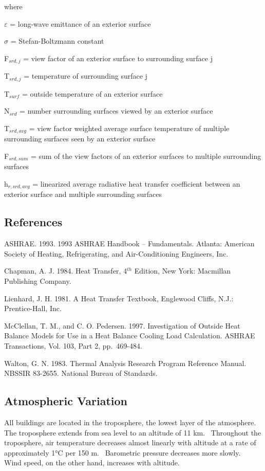 where

$\varepsilon$ = long-wave emittance of an exterior surface

$\sigma$ = Stefan-Boltzmann constant

F\(_{srd,j}\) = view factor of an exterior surface to surrounding surface j

T\(_{srd,j}\) = temperature of surrounding surface j

T\(_{surf}\) = outside temperature of an exterior surface

N\(_{srd}\) = number surrounding surfaces viewed by an exterior surface

T\(_{srd,avg}\) = view factor weighted average surface temperature of multiple surrounding surfaces seen by an exterior surface

F\(_{srd,sum}\) = sum of the view factors of an exterior surfaces to multiple surrounding surfaces

h\(_{r,srd,avg}\) = linearized average radiative heat transfer coefficient between an exterior surface and multiple surrounding surfaces


\subsection{References}\label{references-034}

ASHRAE. 1993. 1993 ASHRAE Handbook -- Fundamentals. Atlanta: American Society of Heating, Refrigerating, and Air-Conditioning Engineers, Inc.

Chapman, A. J. 1984. Heat Transfer, 4\(^{th}\) Edition, New York: Macmillan Publishing Company.

Lienhard, J. H. 1981. A Heat Transfer Textbook, Englewood Cliffs, N.J.: Prentice-Hall, Inc.

McClellan, T. M., and C. O. Pedersen. 1997. Investigation of Outside Heat Balance Models for Use in a Heat Balance Cooling Load Calculation. ASHRAE Transactions, Vol. 103, Part 2, pp.~469-484.

Walton, G. N. 1983. Thermal Analysis Research Program Reference Manual. NBSSIR 83-2655. National Bureau of Standards.

\subsection{Atmospheric Variation}\label{atmospheric-variation}

All buildings are located in the troposphere, the lowest layer of the atmosphere.~ The troposphere extends from sea level to an altitude of 11 km.~ Throughout the troposphere, air temperature decreases almost linearly with altitude at a rate of approximately 1°C per 150 m.~ Barometric pressure decreases more slowly.~ Wind speed, on the other hand, increases with altitude.

